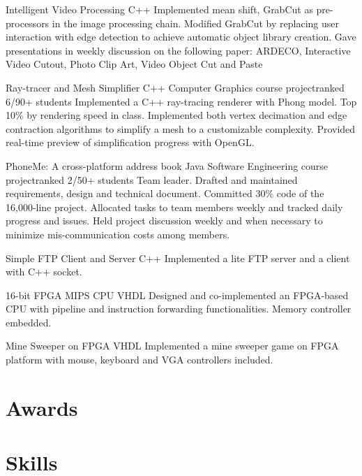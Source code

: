 \documentclass[11pt,a4paper]{moderncv/moderncv}
\begin{document}
{Intelligent Video Processing}
{C++}
{}{}
{
  Implemented mean shift, GrabCut as pre-processors in the image processing chain.
  Modified GrabCut by replacing user interaction with edge detection to achieve automatic object library creation.
  Gave presentations in weekly discussion on the following paper: ARDECO, Interactive Video Cutout, Photo Clip Art, Video Object Cut and Paste
}

{Ray-tracer and Mesh Simplifier}
{C++}
{Computer Graphics course project}{ranked 6/90+ students}
{
  Implemented a C++ ray-tracing renderer with Phong model.
  Top 10\% by rendering speed in class.
  Implemented both vertex decimation and edge contraction algorithms to simplify a mesh to a customizable complexity.
  Provided real-time preview of simplification progress with OpenGL.\
}

{PhoneMe: A cross-platform address book}
{Java}
{Software Engineering course project}{ranked 2/50+ students}
{
  Team leader.
  Drafted and maintained requirements, design and technical document.
  Committed 30\% code of the 16,000-line project.
  Allocated tasks to team members weekly and tracked daily progress and issues.
  Held project discussion weekly and when necessary to minimize mis-communication
  costs among members.
}

{Simple FTP Client and Server}
{C++}
{}{}
{
  Implemented a lite FTP server and a client with C++ socket.
}

{16-bit FPGA MIPS CPU}
{VHDL}
{}{}
{
  Designed and co-implemented an FPGA-based CPU with pipeline and instruction forwarding functionalities. Memory controller embedded.
}

{Mine Sweeper on FPGA}
{VHDL}
{}{}
{
  Implemented a mine sweeper game on FPGA platform with mouse, keyboard and VGA controllers included.
}



\nocite{*}


\section{Awards}


\section{Skills}
\end{document}

